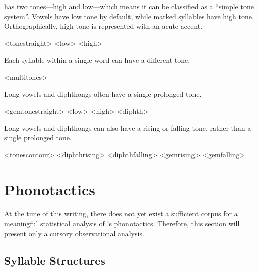 \lang{} has two tones---high and low---which means it can be classified as a \enquote{simple tone system}.\autocite{wals-13} Vowels have low tone by default, while marked syllables have high tone. Orthographically, high tone is represented with an acute accent.

\pex<tonestraight>
	\a<low>    
	\a<high>    
\xe

Each syllable within a single word can have a different tone.

\ex<multitones>
	   
\xe

Long vowels and diphthongs often have a single prolonged tone.

\pex<gemtonestraight>
	\a<low>    
	\a<high>    
	\a<diphth>    
\xe

Long vowels and diphthongs can also have a rising or falling tone, rather than a single prolonged tone.

\pex<tonescontour>
	\a<diphthrising>    
	\a<diphthfalling>    
	\a<gemrising>    
	\a<gemfalling>    
\xe


\section{Phonotactics}
\label{sec:phonotactics}

At the time of this writing, there does not yet exist a sufficient corpus for a meaningful statistical analysis of \lang{}'s phonotactics. Therefore, this section will present only a cursory observational analysis.

\subsection{Syllable Structures}
\label{sec:syllable-structures}

